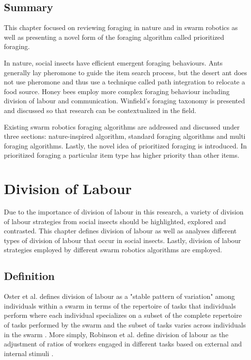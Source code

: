 \section{Summary}
\label{foraging:summary}

This chapter focused on reviewing foraging in nature and in swarm robotics as well as presenting a novel form of the foraging algorithm called prioritized foraging. 

In nature, social insects have efficient emergent foraging behaviours. Ants generally lay pheromone to guide the item search process, but the desert ant does not use pheromone and thus use a technique called path integration to relocate a food source. Honey bees employ more complex foraging behaviour including division of labour and communication. Winfield's foraging taxonomy is presented and discussed so that research can be contextualized in the field. 

Existing swarm robotics foraging algorithms are addressed and discussed under three sections: nature-inspired algorithm, standard foraging algorithms and multi foraging algorithms. Lastly, the novel idea of prioritized foraging is introduced. In prioritized foraging a particular item type has higher priority than other items. 

\chapter{Division of Labour}
\label{chap:divisionoflabour}

Due to the importance of division of labour in this research, a variety of division of labour strategies from social insects should be highlighted, explored and contrasted. This chapter defines division of labour as well as analyses different types of division of labour that occur in social insects. Lastly, division of labour strategies employed by different swarm robotics algorithms are employed. 

\section{Definition}
\label{sec:second:definition}

Oster et al. defines division of labour as a "stable pattern of variation" among individuals within a swarm in terms of the repertoire of tasks that individuals perform where each individual specializes on a subset of the complete repertoire of tasks performed by the swarm and the subset of tasks varies across individuals in the swarm \cite{oster1978caste}.  
More simply, Robinson et al. define division of labour as the adjustment of ratios of workers engaged in different tasks based on external and internal stimuli \cite{robinson1992regulation}.


